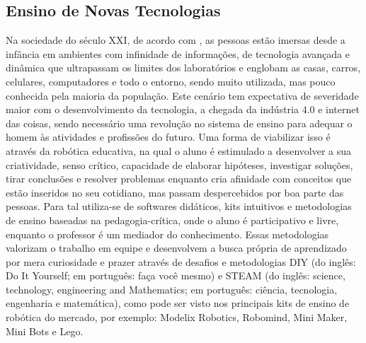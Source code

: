 \subsection{Ensino de Novas Tecnologias}\label{sec:ens_novas_tecn}
Na sociedade do século XXI, de acordo com \cite{benitti}, as pessoas estão imersas desde a infância em ambientes com infinidade de informações, de tecnologia avançada e dinâmica que ultrapassam os limites dos laboratórios e englobam as casas, carros, celulares, computadores e todo o entorno, sendo  muito utilizada, mas pouco conhecida pela maioria da população. Este cenário tem expectativa de severidade maior com o desenvolvimento da tecnologia, a chegada da indústria 4.0 e internet das coisas, sendo necessário uma revolução no sistema de ensino para adequar o homem às atividades e profissões do futuro. Uma forma de viabilizar isso é através da robótica educativa, na qual o aluno é estimulado a desenvolver a sua criatividade, senso crítico, capacidade de elaborar hipóteses, investigar soluções, tirar conclusões e resolver problemas enquanto cria afinidade com conceitos que estão inseridos no seu cotidiano, mas passam despercebidos por boa parte das pessoas. Para tal utiliza-se de softwares didáticos, kits intuitivos e metodologias de ensino baseadas na pedagogia-crítica, onde o aluno é participativo e livre, enquanto o professor é um mediador do conhecimento. Essas metodologias valorizam o trabalho em equipe e desenvolvem a busca própria de aprendizado por mera curiosidade e prazer através de desafios e metodologias DIY (do inglês: Do It Yourself; em português: faça você mesmo) e STEAM (do inglês: science, technology, engineering and Mathematics; em português: ciência, tecnologia, engenharia e matemática), como pode ser visto nos principais kits de ensino de robótica do mercado, por exemplo: Modelix Robotics, Robomind, Mini Maker, Mini Bots e Lego.

